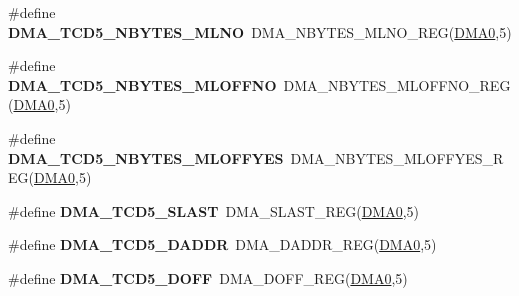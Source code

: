 \begin{DoxyCompactItemize}
\item 
\#define {\bfseries D\+M\+A\+\_\+\+T\+C\+D5\+\_\+\+N\+B\+Y\+T\+E\+S\+\_\+\+M\+L\+NO}~D\+M\+A\+\_\+\+N\+B\+Y\+T\+E\+S\+\_\+\+M\+L\+N\+O\+\_\+\+R\+EG(\hyperlink{group__DMA__Peripheral__Access__Layer_ga4103044f9ca209772f513dc694513ffb}{D\+M\+A0},5)\hypertarget{group__DMA__Register__Accessor__Macros_gac5b5c66904988988e6cadca4fb8428f2}{}\label{group__DMA__Register__Accessor__Macros_gac5b5c66904988988e6cadca4fb8428f2}

\item 
\#define {\bfseries D\+M\+A\+\_\+\+T\+C\+D5\+\_\+\+N\+B\+Y\+T\+E\+S\+\_\+\+M\+L\+O\+F\+F\+NO}~D\+M\+A\+\_\+\+N\+B\+Y\+T\+E\+S\+\_\+\+M\+L\+O\+F\+F\+N\+O\+\_\+\+R\+EG(\hyperlink{group__DMA__Peripheral__Access__Layer_ga4103044f9ca209772f513dc694513ffb}{D\+M\+A0},5)\hypertarget{group__DMA__Register__Accessor__Macros_ga8751f24b9f2e3d213a219e5b42f9e642}{}\label{group__DMA__Register__Accessor__Macros_ga8751f24b9f2e3d213a219e5b42f9e642}

\item 
\#define {\bfseries D\+M\+A\+\_\+\+T\+C\+D5\+\_\+\+N\+B\+Y\+T\+E\+S\+\_\+\+M\+L\+O\+F\+F\+Y\+ES}~D\+M\+A\+\_\+\+N\+B\+Y\+T\+E\+S\+\_\+\+M\+L\+O\+F\+F\+Y\+E\+S\+\_\+\+R\+EG(\hyperlink{group__DMA__Peripheral__Access__Layer_ga4103044f9ca209772f513dc694513ffb}{D\+M\+A0},5)\hypertarget{group__DMA__Register__Accessor__Macros_ga2c2dc1bbc567fb9b81593ca3e926089b}{}\label{group__DMA__Register__Accessor__Macros_ga2c2dc1bbc567fb9b81593ca3e926089b}

\item 
\#define {\bfseries D\+M\+A\+\_\+\+T\+C\+D5\+\_\+\+S\+L\+A\+ST}~D\+M\+A\+\_\+\+S\+L\+A\+S\+T\+\_\+\+R\+EG(\hyperlink{group__DMA__Peripheral__Access__Layer_ga4103044f9ca209772f513dc694513ffb}{D\+M\+A0},5)\hypertarget{group__DMA__Register__Accessor__Macros_ga6300280a7a20a56a96584820c6942421}{}\label{group__DMA__Register__Accessor__Macros_ga6300280a7a20a56a96584820c6942421}

\item 
\#define {\bfseries D\+M\+A\+\_\+\+T\+C\+D5\+\_\+\+D\+A\+D\+DR}~D\+M\+A\+\_\+\+D\+A\+D\+D\+R\+\_\+\+R\+EG(\hyperlink{group__DMA__Peripheral__Access__Layer_ga4103044f9ca209772f513dc694513ffb}{D\+M\+A0},5)\hypertarget{group__DMA__Register__Accessor__Macros_gaf9396476f6de4566cf2caef66b2e6b56}{}\label{group__DMA__Register__Accessor__Macros_gaf9396476f6de4566cf2caef66b2e6b56}

\item 
\#define {\bfseries D\+M\+A\+\_\+\+T\+C\+D5\+\_\+\+D\+O\+FF}~D\+M\+A\+\_\+\+D\+O\+F\+F\+\_\+\+R\+EG(\hyperlink{group__DMA__Peripheral__Access__Layer_ga4103044f9ca209772f513dc694513ffb}{D\+M\+A0},5)\hypertarget{group__DMA__Register__Accessor__Macros_gaed65b973d5ac8e9dbb0bf825058f6b80}{}\label{group__DMA__Register__Accessor__Macros_gaed65b973d5ac8e9dbb0bf825058f6b80}


\end{DoxyCompactItemize}
